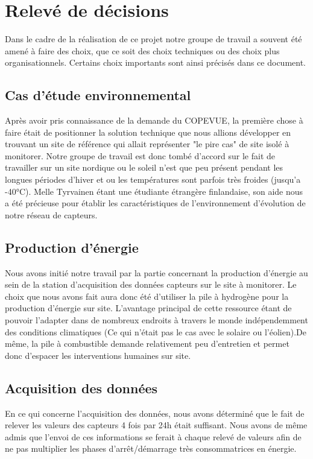\section{Relevé de décisions}
Dans le cadre de la réalisation de ce projet notre groupe de travail a souvent été amené à faire des choix, que ce soit des choix techniques ou des choix plus organisationnels. Certains choix importants sont ainsi précisés dans ce document.
\subsection{Cas d'étude environnemental}
Après avoir pris connaissance de la demande du COPEVUE, la première chose à faire était de positionner la solution technique que nous allions développer en trouvant un site de référence qui allait représenter "le pire cas" de site isolé à monitorer. Notre groupe de travail est donc tombé d'accord sur le fait de travailler sur un site nordique ou le soleil n'est que peu présent pendant les longues périodes d'hiver et ou les températures sont parfois très froides (jusqu'a -40°C). Melle Tyrvainen étant une étudiante étrangère finlandaise, son aide nous a été précieuse pour établir les caractéristiques de l'environnement d'évolution de notre réseau de capteurs.
\medskip
\subsection{Production d'énergie}
Nous avons initié notre travail par la partie concernant la production d'énergie au sein de la station d'acquisition des données capteurs sur le site à monitorer. Le choix que nous avons fait aura donc été d'utiliser la pile à hydrogène pour la production d'énergie sur site. L'avantage principal de cette ressource étant de pouvoir l'adapter dans de nombreux endroits à travers le monde indépendemment des conditions climatiques (Ce qui n'était pas le cas avec le solaire ou l'éolien).De même, la pile à combustible demande relativement peu d'entretien et permet donc d'espacer les interventions humaines sur site.
\medskip
\subsection{Acquisition des données}
En ce qui concerne l'acquisition des données, nous avons déterminé que le fait de relever les valeurs des capteurs 4 fois par 24h était suffisant. Nous avons de même admis que l'envoi de ces informations se ferait à chaque relevé de valeurs afin de ne pas multiplier les phases d'arrêt/démarrage très consommatrices en énergie.
\medskip

